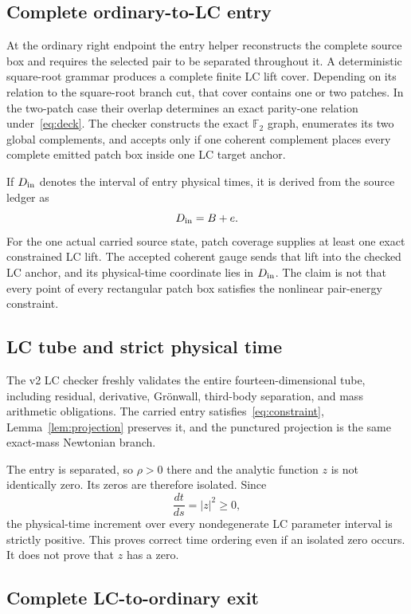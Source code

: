 \documentclass[11pt]{article}
\newcommand{\Ftwo}{\mathbb{F}_2}
\begin{document}
\subsection{Complete ordinary-to-LC entry}

At the ordinary right endpoint the entry helper reconstructs the complete
source box and requires the selected pair to be separated throughout it.  A
deterministic square-root grammar produces a complete finite LC lift cover.
Depending on its relation to the square-root branch cut, that cover contains
one or two patches.  In the two-patch case their overlap determines an exact
parity-one relation under~\eqref{eq:deck}.  The checker constructs the exact
$\Ftwo$ graph, enumerates its two global complements, and accepts only if one
coherent complement places every complete emitted patch box inside one LC
target anchor.

If $D_{\rm in}$ denotes the interval of entry physical times, it is derived
from the source ledger as
\begin{equation}
 D_{\rm in}=B+e.
 \label{eq:entry-clock}
\end{equation}
For the one actual carried source state, patch coverage supplies at least one
exact constrained LC lift.  The accepted coherent gauge sends that lift into
the checked LC anchor, and its physical-time coordinate lies in
$D_{\rm in}$.  The claim is not that every point of every rectangular patch
box satisfies the nonlinear pair-energy constraint.

\subsection{LC tube and strict physical time}

The v2 LC checker freshly validates the entire fourteen-dimensional tube,
including residual, derivative, Gr\"onwall, third-body separation, and mass
arithmetic obligations.  The carried entry satisfies~\eqref{eq:constraint},
Lemma~\ref{lem:projection} preserves it, and the punctured projection is the
same exact-mass Newtonian branch.

The entry is separated, so $\rho>0$ there and the analytic function $z$ is not
identically zero.  Its zeros are therefore isolated.  Since
\[
 \frac{dt}{ds}=|z|^2\ge0,
\]
the physical-time increment over every nondegenerate LC parameter interval is
strictly positive.  This proves correct time ordering even if an isolated
zero occurs.  It does not prove that $z$ has a zero.

\subsection{Complete LC-to-ordinary exit}
\end{document}
